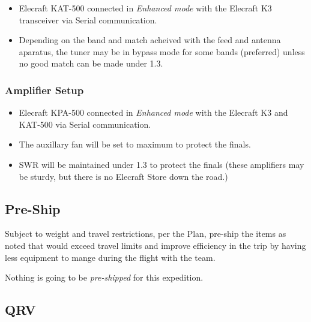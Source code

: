 \documentclass[11pt]{article}
\begin{document}
\begin{itemize}
\item Elecraft KAT-500 connected in {\textit{Enhanced mode}} with the 
Elecraft K3 transceiver via Serial communication.
\item Depending on the band and match acheived with the feed and antenna aparatus,
the tuner may be in bypass mode for some bands (preferred) unless no good match can be
made under 1.3.
\end{itemize}

\subsubsection{Amplifier Setup}

\begin{itemize}
\item Elecraft KPA-500 connected in {\textit{Enhanced mode}} with the
Elecraft K3 and KAT-500 via Serial communication.
\item The auxillary fan will be set to maximum to protect the finals.
\item SWR will be maintained under 1.3 to protect the finals (these amplifiers
may be sturdy, but there is no Elecraft Store down the road.)
\end{itemize}

\subsection{Pre-Ship}

Subject to weight and travel restrictions, per the Plan, pre-ship the items
as noted that would exceed travel limits and improve efficiency
in the trip by having less equipment to mange during the flight with the team.
\par
Nothing is going to be {\textit{pre-shipped}} for this expedition.

\subsection{QRV}
\end{document}
